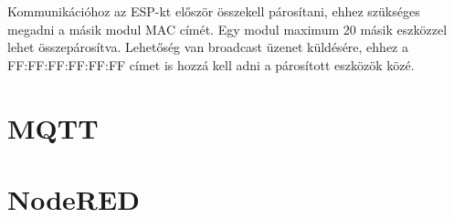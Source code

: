 Kommunikációhoz az ESP-kt először összekell párosítani, ehhez szükséges megadni a másik modul MAC címét. Egy modul maximum 20 másik eszközzel lehet összepárosítva. Lehetőség van broadcast üzenet küldésére, ehhez a FF:FF:FF:FF:FF:FF címet is hozzá kell adni a párosított eszközök közé.


\section{MQTT}
\section{NodeRED}
